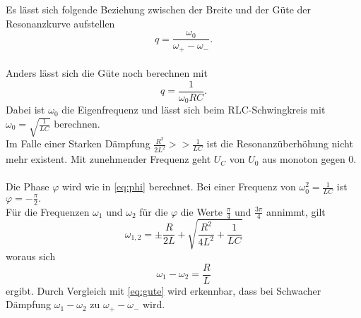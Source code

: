 Es lässt sich folgende Beziehung zwischen der Breite und der Güte der Resonanzkurve aufstellen
\begin{equation*}
    q = \frac{ω_0}{ω_+ - ω_-}.
\end{equation*}\\
Anders lässt sich die Güte noch berechnen mit
\begin{equation}\label{eq:lol}
    q = \frac{1}{\omega_0 R C}.
\end{equation}
Dabei ist $\omega_0$ die Eigenfrequenz und lässt sich beim RLC-Schwingkreis mit $\omega_0 = \sqrt{\frac{1}{LC}}$ berechnen.
\\
Im Falle einer Starken Dämpfung $\frac{R^2}{2L^2} >> \frac{1}{LC}$ ist die Resonanzüberhöhung nicht mehr existent.
Mit zunehmender Frequenz geht $U_C$ von $U_0$ aus monoton gegen $0.$\\
\\
Die Phase $φ$ wird wie in \eqref{eq:phi} berechnet. Bei einer Frequenz von $ω_0^2 = \frac{1}{LC}$ ist $φ = -\frac{\pi}{2}.$\\
Für die Frequenzen $ω_1$ und $ω_2$ für die $φ$ die Werte $\frac{\pi}{4}$ und $\frac{3\pi}{4}$ annimmt, gilt
\begin{equation}\label{eq:w12}
    ω_{1,2} = \pm \frac{R}{2L} + \sqrt{\frac{R^2}{4L^2} + \frac{1}{LC}}
\end{equation}
woraus sich
\begin{equation*}
    ω_1 - ω_2 = \frac{R}{L}
\end{equation*}
ergibt. Durch Vergleich mit \eqref{eq:gute} wird erkennbar, dass bei Schwacher Dämpfung $ω_1 - ω_2$ zu $ω_+ - ω_-$ wird.
